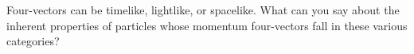 Four-vectors can be timelike, lightlike, or spacelike.
What can you say about the inherent properties of
particles whose momentum four-vectors fall
in these various categories?
